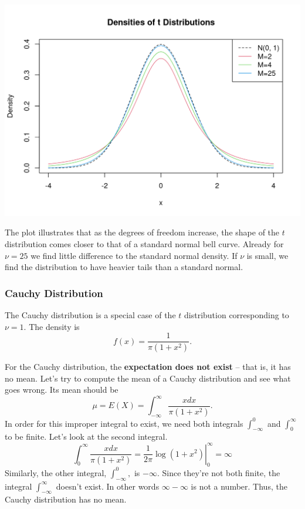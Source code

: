 \documentclass[
  14pt,
]{memoir}
\begin{document}
\begin{center}\includegraphics[width=0.8\linewidth]{figure/minimal-unnamed-chunk-49-1} \end{center}

The plot illustrates that as the degrees of freedom increase, the shape of the \(t\) distribution comes closer to that of a standard normal bell curve. Already for \(\nu=25\) we find little difference to the standard normal density. If \(\nu\) is small, we find the distribution to have heavier tails than a standard normal.

\hypertarget{cauchy-distribution}{%
\subsubsection{Cauchy Distribution}\label{cauchy-distribution}}

The Cauchy distribution is a special
case of the \(t\) distribution corresponding to \(\nu=1\). The density is
\[
f(x)=\frac{1}{\pi\left(1+x^{2}\right)}.
\]

For the Cauchy distribution, the \textbf{expectation does not exist} -- that is, it has no mean. Let's try to compute the mean of a Cauchy distribution and see what goes wrong. Its mean should be
\[
\mu=E(X)=\int_{-\infty}^{\infty} \frac{x d x}{\pi\left(1+x^{2}\right)}.
\]
In order for this improper integral to exist, we need both integrals \(\int_{-\infty}^{0}\) and \(\int_{0}^{\infty}\) to be finite. Let's look at the second integral.
\[
\int_{0}^{\infty} \frac{x d x}{\pi\left(1+x^{2}\right)}=\left.\frac{1}{2 \pi} \log \left(1+x^{2}\right)\right|_{0} ^{\infty}=\infty
\]
Similarly, the other integral, \(\int_{-\infty}^{0},\) is \(-\infty\). Since they're not both finite, the integral \(\int_{-\infty}^{\infty}\) doesn't exist. In other words \(\infty-\infty\) is not a number. Thus, the Cauchy distribution has no mean.
\end{document}

